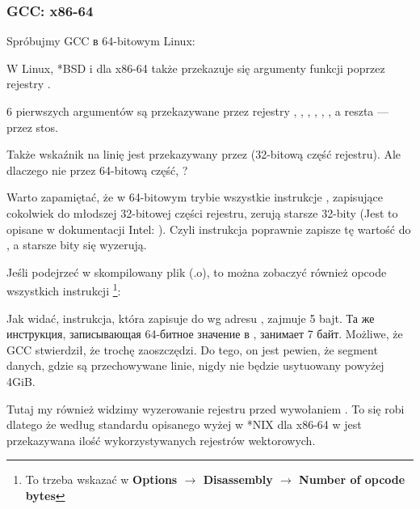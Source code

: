 \subsubsection{GCC: x86-64}

Spróbujmy GCC в 64-bitowym Linux:



W Linux, *BSD i \MacOSX dla x86-64 także przekazuje się argumenty funkcji poprzez rejestry \SysVABI.

6 pierwszych argumentów są przekazywane przez rejestry \RDI, \RSI, \RDX, \RCX, , , a reszta --- przez stos.

Także wskaźnik na linię jest przekazywany przez \EDI (32-bitową część rejestru).
Ale dlaczego nie przez 64-bitową część, \RDI?

Warto zapamiętać, że w 64-bitowym trybie wszystkie instrukcje \MOV, zapisujące cokolwiek do młodszej 32-bitowej części rejestru, zerują starsze 32-bity (Jest to opisane w dokumentacji Intel: ).
Czyli instrukcja  poprawnie zapisze tę wartość do \RAX, a starsze bity się wyzerują.

Jeśli podejrzeć w \IDA skompilowany plik (.o), to można zobaczyć również opcode wszystkich instrukcji
\footnote{To trzeba wskazać w \textbf{Options $\rightarrow$ Disassembly $\rightarrow$ Number of opcode bytes}}:



\label{hw_EDI_instead_of_RDI}
Jak widać, instrukcja, która zapisuje do \EDI wg adresu , zajmuje 5 bajt.
Та же инструкция, записывающая 64-битное значение в \RDI, занимает 7 байт.
Możliwe, że GCC stwierdził, że trochę zaoszczędzi.
Do tego, on jest pewien, że segment danych, gdzie są przechowywane linie, nigdy nie będzie usytuowany powyżej 4\gls{GiB}.

\label{SysVABI_input_EAX}
Tutaj my również widzimy wyzerowanie rejestru \EAX przed wywołaniem \printf.
To się robi dlatego że według standardu opisanego wyżej w *NIX dla x86-64 w \EAX jest przekazywana ilość wykorzystywanych rejestrów wektorowych.


